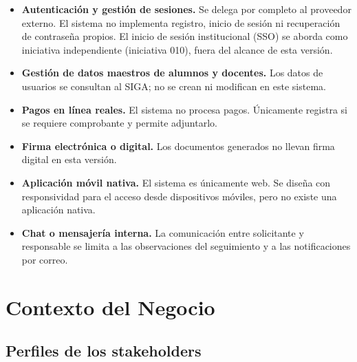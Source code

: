 \documentclass[12pt,letterpaper]{report}
\begin{document}
\begin{itemize}
    \item \textbf{Autenticación y gestión de sesiones.} Se delega por completo al proveedor externo. El sistema no implementa registro, inicio de sesión ni recuperación de contraseña propios. El inicio de sesión institucional (SSO) se aborda como iniciativa independiente (iniciativa 010), fuera del alcance de esta versión.
    \item \textbf{Gestión de datos maestros de alumnos y docentes.} Los datos de usuarios se consultan al SIGA; no se crean ni modifican en este sistema.
    \item \textbf{Pagos en línea reales.} El sistema no procesa pagos. Únicamente registra si se requiere comprobante y permite adjuntarlo.
    \item \textbf{Firma electrónica o digital.} Los documentos generados no llevan firma digital en esta versión.
    \item \textbf{Aplicación móvil nativa.} El sistema es únicamente web. Se diseña con responsividad para el acceso desde dispositivos móviles, pero no existe una aplicación nativa.
    \item \textbf{Chat o mensajería interna.} La comunicación entre solicitante y responsable se limita a las observaciones del seguimiento y a las notificaciones por correo.
\end{itemize}

\chapter{Contexto del Negocio}

\section{Perfiles de los stakeholders}
\end{document}
